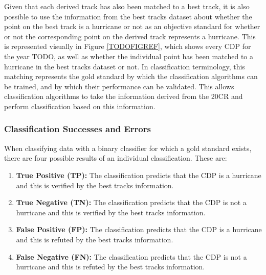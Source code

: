 \documentclass[pdftex,12pt,a4paper]{report}
\begin{document}
Given that each derived track has also been matched to a best track, it is also possible to use the
information from the best tracks dataset about whether the point on the best track is a hurricane or
not as an objective standard for whether or not the corresponding point on the derived track
represents a hurricane. This is represented visually in Figure \ref{TODOFIGREF}, which shows every
CDP for the year TODO, as well as whether the individual point has been matched to a hurricane in
the best tracks dataset or not. In classification terminology, this matching represents the gold
standard by which the classification algorithms can be trained, and by which their performance can
be validated.  This allows classification algorithms to take the information derived from the 20CR
and perform classification based on this information.


\subsubsection{Classification Successes and Errors}


When classifying data with a binary classifier for which a gold standard exists, there are four
possible results of an individual classification. These are:

\begin{enumerate}
    \item \textbf{True Positive (TP):} The classification predicts that the CDP is a hurricane and
        this is verified by the best tracks information.
    \item \textbf{True Negative (TN):} The classification predicts that the CDP is not a hurricane
        and this is verified by the best tracks information.
    \item \textbf{False Positive (FP):} The classification predicts that the CDP is a hurricane and
        this is refuted by the best tracks information.
    \item \textbf{False Negative (FN):} The classification predicts that the CDP is not a hurricane
        and this is refuted by the best tracks information.
\end{enumerate}
\end{document}
